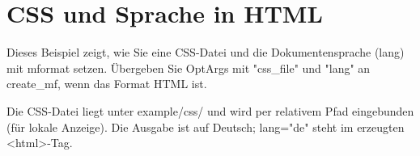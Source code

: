 \documentclass[a4paper]{report}
\begin{document}
\chapter{CSS und Sprache in HTML}

Dieses Beispiel zeigt, wie Sie eine CSS-Datei und die Dokumentensprache (lang) mit mformat setzen. Übergeben Sie OptArgs mit "css\_file" und "lang" an create\_mf, wenn das Format HTML ist.

Die CSS-Datei liegt unter example/css/ und wird per relativem Pfad eingebunden (für lokale Anzeige). Die Ausgabe ist auf Deutsch; lang="de" steht im erzeugten \textless{}html\textgreater{}-Tag.
\end{document}
